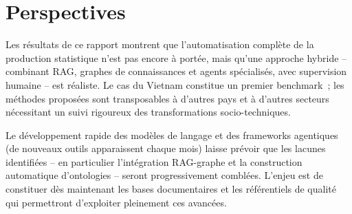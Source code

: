 \documentclass[a4paper,11pt]{report}
\begin{document}
\section{Perspectives}

Les résultats de ce rapport montrent que l'automatisation complète de la production statistique n'est pas encore à portée, mais qu'une approche hybride -- combinant RAG, graphes de connaissances et agents spécialisés, avec supervision humaine -- est réaliste. Le cas du Vietnam constitue un premier benchmark~; les méthodes proposées sont transposables à d'autres pays et à d'autres secteurs nécessitant un suivi rigoureux des transformations socio-techniques.

Le développement rapide des modèles de langage et des frameworks agentiques (de nouveaux outils apparaissent chaque mois) laisse prévoir que les lacunes identifiées -- en particulier l'intégration RAG-graphe et la construction automatique d'ontologies -- seront progressivement comblées. L'enjeu est de constituer dès maintenant les bases documentaires et les référentiels de qualité qui permettront d'exploiter pleinement ces avancées.


\end{document}
